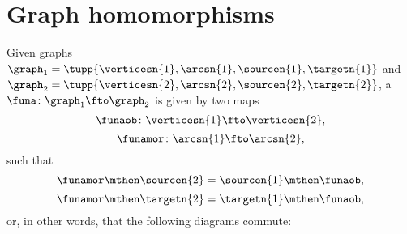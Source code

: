 
\section{Graph homomorphisms}
\begin{ctdefinition}
    \label{def:graph-homomorphism}
    Given graphs~$\graph_1=\tupp{\verticesn{1},\arcsn{1},\sourcen{1},\targetn{1}}$ and~$\graph_2=\tupp{\verticesn{2},\arcsn{2},\sourcen{2},\targetn{2}}$, a ~$\funa \colon \graph_1 \fto \graph_2$ is given by two maps~
    \begin{equation}
        \funaob\colon \verticesn{1} \fto \verticesn{2},
    \end{equation}
    \begin{equation}
        \funamor\colon \arcsn{1} \fto \arcsn{2},
    \end{equation}
    such that
    \begin{equation}
        \funamor \mthen \sourcen{2} = \sourcen{1}\mthen \funaob,
    \end{equation}
    \begin{equation}
        \funamor \mthen \targetn{2} = \targetn{1}\mthen \funaob,
    \end{equation}
    or, in other words, that the following diagrams commute:
    \begin{center}
    \end{center}
    \begin{center}

\end{center}
\end{ctdefinition}
